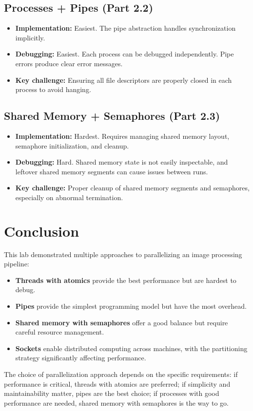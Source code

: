 \documentclass[12pt,a4paper]{article}
\begin{document}
\subsection{Processes + Pipes (Part 2.2)}
\begin{itemize}
    \item \textbf{Implementation:} Easiest. The pipe abstraction handles synchronization implicitly.
    \item \textbf{Debugging:} Easiest. Each process can be debugged independently. Pipe errors produce clear error messages.
    \item \textbf{Key challenge:} Ensuring all file descriptors are properly closed in each process to avoid hanging.
\end{itemize}

\subsection{Shared Memory + Semaphores (Part 2.3)}
\begin{itemize}
    \item \textbf{Implementation:} Hardest. Requires managing shared memory layout, semaphore initialization, and cleanup.
    \item \textbf{Debugging:} Hard. Shared memory state is not easily inspectable, and leftover shared memory segments can cause issues between runs.
    \item \textbf{Key challenge:} Proper cleanup of shared memory segments and semaphores, especially on abnormal termination.
\end{itemize}

\section{Conclusion}

This lab demonstrated multiple approaches to parallelizing an image processing pipeline:
\begin{itemize}
    \item \textbf{Threads with atomics} provide the best performance but are hardest to debug.
    \item \textbf{Pipes} provide the simplest programming model but have the most overhead.
    \item \textbf{Shared memory with semaphores} offer a good balance but require careful resource management.
    \item \textbf{Sockets} enable distributed computing across machines, with the partitioning strategy significantly affecting performance.
\end{itemize}

The choice of parallelization approach depends on the specific requirements: if performance is critical, threads with atomics are preferred; if simplicity and maintainability matter, pipes are the best choice; if processes with good performance are needed, shared memory with semaphores is the way to go.
\end{document}
